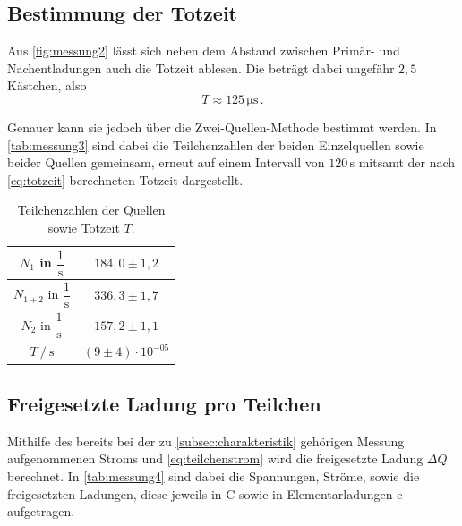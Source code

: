 \subsection{Bestimmung der Totzeit}

Aus \autoref{fig:messung2} lässt sich neben dem Abstand zwischen Primär- und Nachentladungen auch die Totzeit ablesen.
Die beträgt dabei ungefähr $2,5$ Kästchen, also
\begin{equation*}
    T \approx 125 \,\unit{\micro\second} \,.
\end{equation*}

Genauer kann sie jedoch über die Zwei-Quellen-Methode bestimmt werden.
In \autoref{tab:messung3} sind dabei die Teilchenzahlen der beiden Einzelquellen sowie beider Quellen gemeinsam, erneut auf einem Intervall von $120 \,\unit{\second}$ mitsamt der nach \eqref{eq:totzeit} berechneten Totzeit dargestellt.

\begin{table}[H] %
    \centering
    \caption{Teilchenzahlen der Quellen sowie Totzeit $T$.}
    \label{tab:messung3}
    \begin{tabular}{|S | S|}
      \hline
        {$N_1$ in $\dfrac{1}{\unit{\second}}$}                             &  {$184,0 \pm 1,2$}  \\
        \hline
        {$N_{1 + 2}$ in $\dfrac{1}{\unit{\second}}$}                      &  {$336,3 \pm 1,7$}    \\
        \hline
        {$N_2$ in $\dfrac{1}{\unit{\second}}$}                             &  {$157,2 \pm 1,1$}    \\
        \hline
        {$T \mathbin{/} \unit{\second}$}    &  {$(9 \pm 4) \cdot 10^{-05}$} \\
    \hline
    \end{tabular}
\end{table}


\subsection{Freigesetzte Ladung pro Teilchen}
\label{subsec:ladung}

Mithilfe des bereits bei der zu \autoref{subsec:charakteristik} gehörigen Messung aufgenommenen Stroms und \eqref{eq:teilchenstrom} wird die freigesetzte Ladung $\Delta Q$ berechnet.
In \autoref{tab:messung4} sind dabei die Spannungen, Ströme, sowie die freigesetzten Ladungen, diese jeweils in $\unit{\coulomb}$ sowie in Elementarladungen $\text{e}$ aufgetragen.

